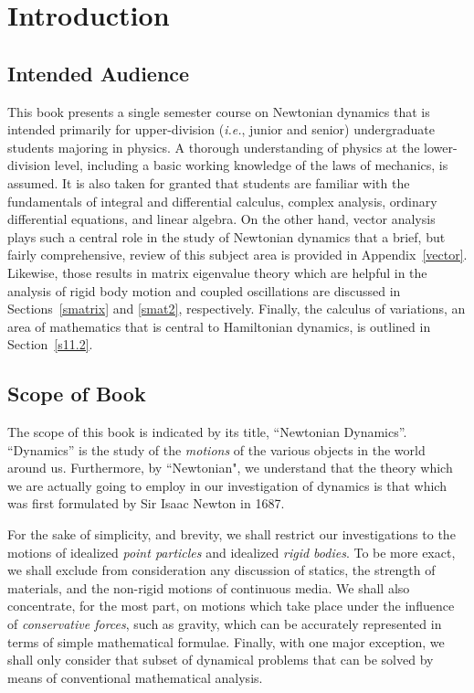 \chapter{Introduction}
\section{Intended Audience}
This book presents a single semester course  on Newtonian dynamics that is intended primarily for upper-division ({\em i.e.}, junior and senior) undergraduate students majoring in physics. A thorough  understanding
of physics at the lower-division level, including a basic working
knowledge of the laws of mechanics, is assumed. It is
also taken for granted that students are
 familiar with the fundamentals of integral and differential
calculus,  complex analysis,  ordinary differential equations, and linear algebra. 
On the other hand, vector analysis plays such a central role in the study of Newtonian
dynamics that a brief, but fairly comprehensive, 
review of this subject area is provided in Appendix~\ref{vector}. 
Likewise, those results in matrix eigenvalue theory which are helpful in the analysis of  rigid body motion
and coupled oscillations are discussed in Sections~\ref{smatrix} and
\ref{smat2}, respectively. Finally, the calculus of variations, an area of mathematics that 
is central to Hamiltonian dynamics, is
outlined in Section~\ref{s11.2}.

\section{Scope of Book}
The scope of this book is indicated by its title, ``Newtonian Dynamics''.   ``Dynamics''
is the study of the {\em motions}\/ of the various objects in the
world around us. Furthermore, by ``Newtonian", we understand that the theory
 which we are actually going to employ in our investigation of dynamics is that which was first formulated by Sir  Isaac Newton
in 1687. 

For the sake of simplicity, and brevity, we shall restrict our investigations to the motions
of  idealized {\em point particles}\/ and idealized {\em rigid bodies}.  To be more exact, we shall exclude from consideration any discussion of statics, the strength of materials, and the non-rigid motions of continuous media. We shall also concentrate, for the most
part, on motions which take place  under the influence of {\em conservative forces}, such as gravity, which can be
accurately represented in terms of simple mathematical formulae. Finally, with one major exception, we shall only
consider that subset of dynamical problems that can be solved by means
of conventional mathematical analysis. 

